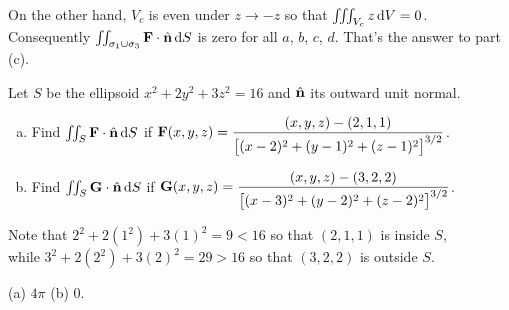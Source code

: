 \begin{solution}
On the other hand,  $V_c$ is even under $z\rightarrow -z$ so that 
$\iiint_{V_c} z\,\mathrm{d}V=0$. Consequently
$\iint_{\sigma_1\cup\sigma_3} \mathbf{F}\cdot\hat{\mathbf{n}}\,\mathrm{d}S$ is zero for all $a$, $b$,
$c$, $d$.  That's the answer to part (c).

\end{solution}

\begin{question}[M317 2005A] %
Let $S$ be the ellipsoid $x^2+2y^2+3z^2=16$ and $\hat{\mathbf{n}}$ its outward unit 
normal.
\begin{enumerate}[(a)]
\item
Find $\iint_S \mathbf{F}\cdot\hat{\mathbf{n}}\,\mathrm{d}S$ if
$\mathbf{F}(x,y,z)=\dfrac{(x,y,z)-(2,1,1)}{{\big[(x-2)^2+(y-1)^2+(z-1)^2\big]}^{3/2}}$.
\item
Find $\iint_S \mathbf{G}\cdot\hat{\mathbf{n}}\,\mathrm{d}S$ if
$\mathbf{G}(x,y,z)=\dfrac{(x,y,z)-(3,2,2)}{{\big[(x-3)^2+(y-2)^2+(z-2)^2\big]}^{3/2}}$.
\end{enumerate}
\end{question}

\begin{hint} 
Note that $2^2+2(1^2)+3(1)^2 = 9<16$ so that $(2,1,1)$ is inside $S$,\\
while $3^2+2(2^2)+3(2)^2 = 29>16$ so that $(3,2,2)$ is outside $S$.
\end{hint}

\begin{answer} 
(a) $4\pi$  \qquad
(b) $0$.
\end{answer}


